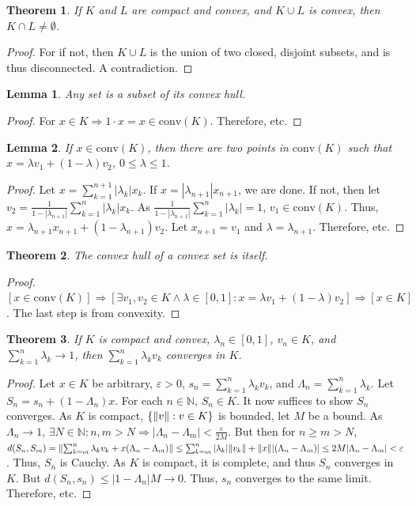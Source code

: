 \documentclass[oneside]{book}
\theoremstyle{mystyle}
\newtheorem{theorem}{Theorem}[section]
\newtheorem{lemma}{Lemma}[section]
\DeclarePairedDelimiter\norm{\lVert}{\rVert}
\begin{document}
\begin{theorem}
If $K$ and $L$ are compact and convex, and $K\cup L$ is convex, then $K\cap L \ne \emptyset$.
\end{theorem}
\begin{proof}
For if not, then $K\cup L$ is the union of two closed, disjoint subsets, and is thus disconnected. A contradiction. 
\end{proof}
%
\begin{lemma}
Any set is a subset of its convex hull.
\end{lemma}
\begin{proof}
For $x\in K \Rightarrow 1\cdot x=x \in \textrm{conv}(K)$. Therefore, etc.
\end{proof}
%
\begin{lemma}
If $x\in \textrm{conv}(K)$, then there are two points in $\textrm{conv}(K)$ such that $x = \lambda v_1 +(1- \lambda) v_2$, $0 \leq \lambda \leq 1$.
\end{lemma}
\begin{proof}
Let $x=\sum_{k=1}^{n+1}|\lambda_k| x_k$. If $x=|\lambda_{n+1}|x_{n+1}$, we are done. If not, then let $v_2 = \frac{1}{1-|\lambda_{n+1}|}\sum_{k=1}^{n}|\lambda_k|x_k$. As $\frac{1}{1-|\lambda_{n+1}|}\sum_{k=1}^{n}|\lambda_k| = 1$, $v_1\in \textrm{conv}(K)$. Thus, $x = \lambda_{n+1}x_{n+1}+(1-\lambda_{n+1})v_2$. Let $x_{n+1}=v_1$ and $\lambda = \lambda_{n+1}$. Therefore, etc.
\end{proof}
%
\begin{theorem}
The convex hull of a convex set is itself.
\end{theorem}
\begin{proof}
$[x\in \textrm{conv}(K)]\Rightarrow [\exists v_1,v_2\in K\land \lambda\in[0,1]:x=\lambda v_1+(1-\lambda)v_2]\Rightarrow [x\in K]$. The last step is from convexity.
\end{proof}
%
\begin{theorem}
If $K$ is compact and convex, $\lambda_n\in[0,1]$, $v_n\in K$, and $\sum_{k=1}^{n}\lambda_k \rightarrow 1$, then $\sum_{k=1}^{n}\lambda_k v_k$ converges in $K$.
\end{theorem}
\begin{proof}
Let $x\in K$ be arbitrary, $\varepsilon>0$, $s_n = \sum_{k=1}^{n}\lambda_k v_k$, and $\Lambda_n = \sum_{k=1}^{n}\lambda_k$. Let $S_n = s_n + (1-\Lambda_n)x$. For each $n\in \mathbb{N}$, $S_n\in K$. It now suffices to show $S_n$ converges. As $K$ is compact, $\{\norm{v}:v\in K\}$ is bounded, let $M$ be a bound. As $\Lambda_n\rightarrow 1$, $\exists N\in \mathbb{N}:n,m>N\Rightarrow |\Lambda_n-\Lambda_m|<\frac{\varepsilon}{2M}$. But then for $n\geq m >N$, $d(S_n,S_m) = \norm{\sum_{k=m}^{n}\lambda_k v_k+x(\Lambda_n-\Lambda_m)} \leq \sum_{k=m}^{n}|\lambda_k| \norm{v_k}+\norm{x}|(\Lambda_n-\Lambda_m)|\leq 2M|\Lambda_{n}-\Lambda_{m}|<\varepsilon$. Thus, $S_n$ is Cauchy. As $K$ is compact, it is complete, and thus $S_n$ converges in $K$. But $d(S_n,s_n)\leq |1-\Lambda_n|M\rightarrow 0$. Thus, $s_n$ converges to the same limit. Therefore, etc.
\end{proof}
\end{document}
